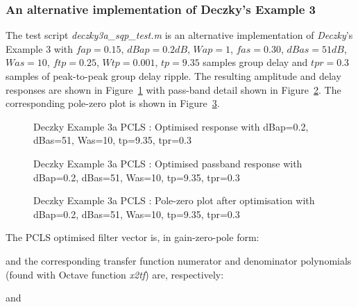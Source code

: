\documentclass[a4paper,twoside,10pt,english]{report}
\begin{document}
\subsubsection{An alternative implementation of Deczky's Example 3}
The test script \emph{deczky3a\_sqp\_test.m} is an alternative implementation
of \emph{Deczky}'s Example 3 with $fap=0.15$, $dBap=0.2dB$, $Wap=1$, $fas=0.30$,
$dBas=51dB$, $Was=10$, $ftp=0.25$, $Wtp=0.001$, $tp=9.35$ samples group delay and
$tpr=0.3$ samples of peak-to-peak group delay ripple. The resulting amplitude 
and delay responses are shown in Figure~\ref{fig:Deczky-Example-3a-PCLS-d1} with 
pass-band detail shown in Figure~\ref{fig:Deczky-Example-3a-PCLS-d1-passband}. 
The corresponding pole-zero plot is shown in 
Figure~\ref{fig:Deczky-Example-3a-PCLS-d1-pz}. 
\begin{figure}[!htb]
\begin{center}
\scalebox{0.7}{}
\caption{Deczky Example 3a PCLS : Optimised response with dBap=0.2, dBas=51, Was=10, tp=9.35, tpr=0.3}
\label{fig:Deczky-Example-3a-PCLS-d1}
\end{center}
\end{figure}
\begin{figure}[!htb]
\begin{center}
\scalebox{0.7}{}
\caption{Deczky Example 3a PCLS : Optimised passband response with dBap=0.2, dBas=51, Was=10, tp=9.35, tpr=0.3}
\label{fig:Deczky-Example-3a-PCLS-d1-passband}
\end{center}
\end{figure}
\begin{figure}[!htb]
\begin{center}
\scalebox{0.7}{}
\caption{Deczky Example 3a PCLS : Pole-zero plot after optimisation with dBap=0.2, dBas=51, Was=10, tp=9.35, tpr=0.3}
\label{fig:Deczky-Example-3a-PCLS-d1-pz}
\end{center}
\end{figure}
The PCLS optimised filter vector is, in gain-zero-pole form:
\begin{small}

\end{small}
and the corresponding transfer function numerator and denominator polynomials
(found with Octave function \emph{x2tf}) are, respectively:
\begin{small}

\end{small}
and
\begin{small}

\end{small}
\end{document}
